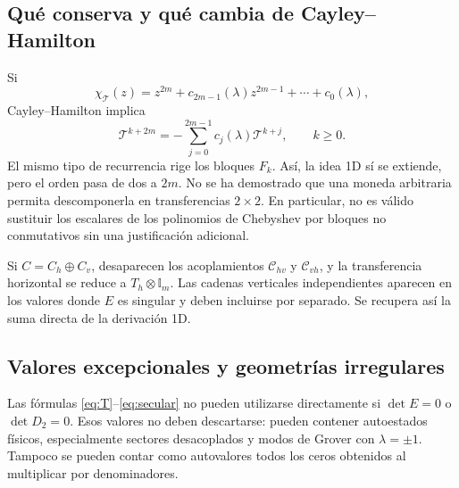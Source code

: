 \documentclass[11pt,a4paper]{article}
\newcommand{\Id}{\mathbb I}
\newcommand{\T}{\mathcal T}
\numberwithin{equation}{section}
\begin{document}
\subsection{Qué conserva y qué cambia de Cayley--Hamilton}
Si
\begin{equation}
 \chi_{\T}(z)=z^{2m}+c_{2m-1}(\lambda)z^{2m-1}
 +\cdots+c_0(\lambda),
\end{equation}
Cayley--Hamilton implica
\begin{equation}\label{eq:CH}
 \T^{k+2m}=-\sum_{j=0}^{2m-1}c_j(\lambda)\T^{k+j},\qquad k\ge0.
\end{equation}
El mismo tipo de recurrencia rige los bloques $F_k$. Así, la idea 1D sí se extiende, pero el orden pasa de dos a $2m$. No se ha demostrado que una moneda arbitraria permita descomponerla en transferencias $2\times2$. En particular, no es válido sustituir los escalares de los polinomios de Chebyshev por bloques no conmutativos sin una justificación adicional.

Si $C=C_h\oplus C_v$, desaparecen los acoplamientos $\mathcal C_{hv}$ y $\mathcal C_{vh}$, y la transferencia horizontal se reduce a $T_h\otimes\Id_m$. Las cadenas verticales independientes aparecen en los valores donde $E$ es singular y deben incluirse por separado. Se recupera así la suma directa de la derivación 1D.

\subsection{Valores excepcionales y geometrías irregulares}
Las fórmulas \eqref{eq:T}--\eqref{eq:secular} no pueden utilizarse directamente si $\det E=0$ o $\det D_2=0$. Esos valores no deben descartarse: pueden contener autoestados físicos, especialmente sectores desacoplados y modos de Grover con $\lambda=\pm1$. Tampoco se pueden contar como autovalores todos los ceros obtenidos al multiplicar por denominadores.
\end{document}
